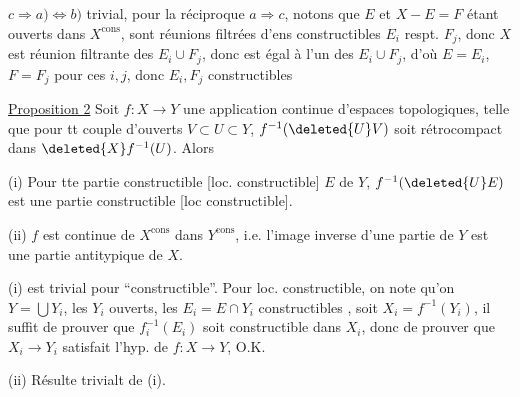 $c\Rightarrow a)\Longleftrightarrow b)$ trivial, pour la réciproque $a\Rightarrow c$, notons que $E$ et $X-E=F$ étant ouverts dans $X^{\mathrm{cons}}$, sont réunions   filtrées d'ens constructibles $E_i$ respt. $F_j$, donc $X$ est réunion filtrante des $E_i\cup F_j$, donc est égal à l'un des $E_i\cup F_j$, d'où $E=E_i$,  $F=F_j$ pour ces $i,j$, donc $E_i,F_j$ constructibles

\uline{Proposition 2} Soit $f:X\longrightarrow Y$ une application continue d'espaces topologiques, telle que  pour tt couple d'ouverts $V\subset U\subset Y$,   $f^{-1}(\deleted{U}V)$ soit rétrocompact dans $\deleted{X}f^{-1}(U)$. Alors


 (i) Pour tte partie constructible [loc. constructible]   $E$ de $Y$, $f^{-1}(\deleted{U}E)$ est une partie constructible [loc constructible].

(ii) $f$ est continue de $X^{\mathrm{cons}}$ dans $Y^{\mathrm{cons}}$, i.e. l'image inverse d'une partie   de $Y$ est une partie  antitypique de $X$.

 (i) est trivial pour ``constructible''. Pour loc. constructible, on note qu'on  $Y=\bigcup Y_i$, les $Y_i$ ouverts, les $E_i=E\cap Y_i$ constructibles , soit $X_i=f^{-1}(Y_i)$,  il suffit de prouver que $f_i^{-1}(E_i)$ soit constructible dans $X_i$, donc de prouver que  $X_i\to Y_i$ satisfait l'hyp. de $f:X\longrightarrow Y$,  O.K.

(ii) Résulte trivialt de (i).

